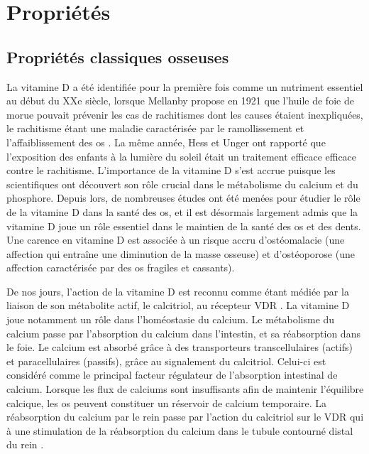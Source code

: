 \documentclass[
  a4paper,
  DIV=11,
  numbers=noendperiod,
  listof=totoc]{scrreprt}
\begin{document}
\hypertarget{propriuxe9tuxe9s}{%
\section{Propriétés}\label{propriuxe9tuxe9s}}

\hypertarget{propriuxe9tuxe9s-classiques-osseuses}{%
\subsection{Propriétés classiques
osseuses}\label{propriuxe9tuxe9s-classiques-osseuses}}

La vitamine D a été identifiée pour la première fois comme un nutriment
essentiel au début du XXe siècle, lorsque Mellanby propose en 1921 que
l'huile de foie de morue pouvait prévenir les cas de rachitismes dont
les causes étaient inexpliquées, le rachitisme étant une maladie
caractérisée par le ramollissement et l'affaiblissement des os
\autocite{Mavrotas.2021}. La même année, Hess et Unger ont rapporté que
l'exposition des enfants à la lumière du soleil était un traitement
efficace efficace contre le rachitisme. \autocite{Holick.2015}
L'importance de la vitamine D s'est accrue puisque les scientifiques ont
découvert son rôle crucial dans le métabolisme du calcium et du
phosphore. Depuis lors, de nombreuses études ont été menées pour étudier
le rôle de la vitamine D dans la santé des os, et il est désormais
largement admis que la vitamine D joue un rôle essentiel dans le
maintien de la santé des os et des dents. Une carence en vitamine D est
associée à un risque accru d'ostéomalacie (une affection qui entraîne
une diminution de la masse osseuse) et d'ostéoporose (une affection
caractérisée par des os fragiles et cassants).

De nos jours, l'action de la vitamine D est reconnu comme étant médiée
par la liaison de son métabolite actif, le calcitriol, au récepteur VDR
\autocite{Norman.2008,Dankers.2017}. La vitamine D joue notamment un
rôle dans l'homéostasie du calcium. Le métabolisme du calcium passe par
l'absorption du calcium dans l'intestin, et sa réabsorption dans le
foie. Le calcium est absorbé grâce à des transporteurs transcellulaires
(actifs) et paracellulaires (passifs), grâce au signalement du
calcitriol. Celui-ci est considéré comme le principal facteur régulateur
de l'absorption intestinal de calcium. Lorsque les flux de calciums sont
insuffisants afin de maintenir l'équilibre calcique, les os peuvent
constituer un réservoir de calcium temporaire. La réabsorption du
calcium par le rein passe par l'action du calcitriol sur le VDR qui à
une stimulation de la réabsorption du calcium dans le tubule contourné
distal du rein \autocite{Carmeliet.2015}.
\end{document}
